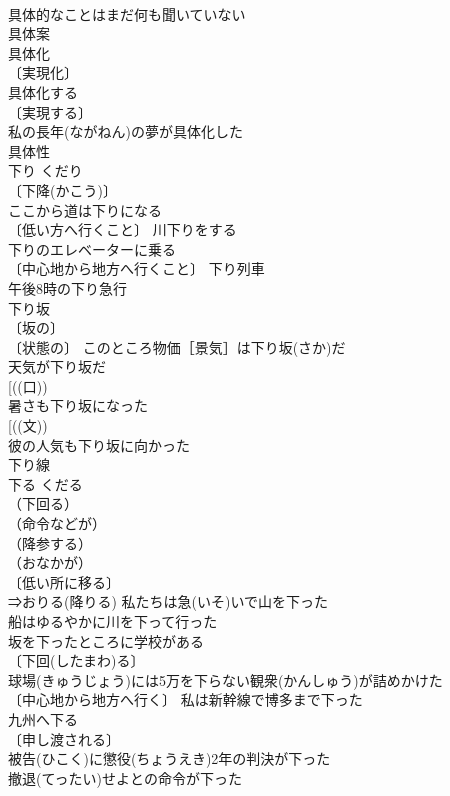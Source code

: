 \documentclass[8pt]{extreport}
\begin{document}
\begin{CJK}{UTF8}{min}
\\	具体的なことはまだ何も聞いていない 
\\	具体案 
\\	具体化 
\\	〔実現化〕
\\	具体化する 
\\	〔実現する〕
\\	私の長年(ながねん)の夢が具体化した 
\\	具体性 
\\	下り	くだり	
\\	〔下降(かこう)〕
\\	ここから道は下りになる 
\\	〔低い方へ行くこと〕 川下りをする 
\\	下りのエレベーターに乗る 
\\	〔中心地から地方へ行くこと〕 下り列車 
\\	午後8時の下り急行 
\\	下り坂 
\\	〔坂の〕
\\	〔状態の〕 このところ物価［景気］は下り坂(さか)だ 
\\	天気が下り坂だ 
\\	[((口))
\\	暑さも下り坂になった 
\\	[((文))
\\	彼の人気も下り坂に向かった 
\\	下り線 
\\	下る	くだる	
\\	（下回る）
\\	（命令などが）
\\	（降参する）
\\	（おなかが）
\\	〔低い所に移る〕
\\	⇒おりる(降りる) 私たちは急(いそ)いで山を下った 
\\	船はゆるやかに川を下って行った 
\\	坂を下ったところに学校がある 
\\	〔下回(したまわ)る〕
\\	球場(きゅうじょう)には5万を下らない観衆(かんしゅう)が詰めかけた 
\\	〔中心地から地方へ行く〕 私は新幹線で博多まで下った 
\\	九州へ下る 
\\	〔申し渡される〕
\\	被告(ひこく)に懲役(ちょうえき)2年の判決が下った 
\\	撤退(てったい)せよとの命令が下った 

\end{CJK}
\end{document}
